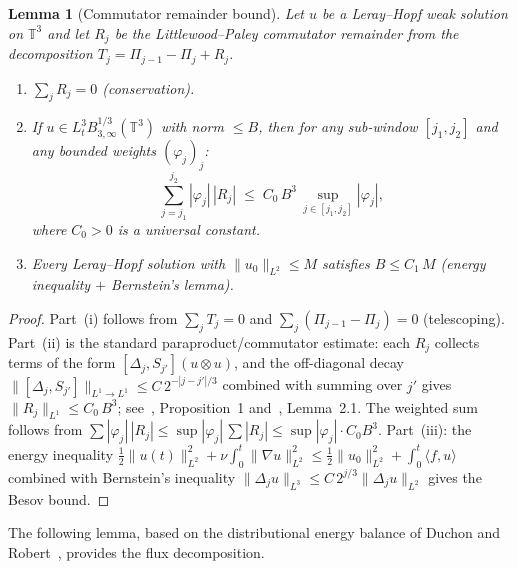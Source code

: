 \documentclass[12pt,a4paper]{article}
\theoremstyle{definition}
\theoremstyle{plain}
\newtheorem{lemma}[definition]{Lemma}
\theoremstyle{remark}
\begin{document}
\begin{lemma}[Commutator remainder bound]\label{lem:remainder}
Let $u$ be a Leray--Hopf weak solution on $\mathbb{T}^3$ and let $R_j$
be the Littlewood--Paley commutator remainder from the decomposition
$T_j = \Pi_{j-1} - \Pi_j + R_j$.
\begin{enumerate}
  \item[\textup{(i)}] $\sum_j R_j = 0$ (conservation).
  \item[\textup{(ii)}] If $u \in L^3_t B^{1/3}_{3,\infty}(\mathbb{T}^3)$
    with norm $\le B$, then for any sub-window $[j_1, j_2]$ and any
    bounded weights $(\varphi_j)_j$:
    \begin{equation}\label{eq:Rj-bound}
      \sum_{j=j_1}^{j_2} |\varphi_j|\,|R_j|
      \;\le\;
      C_0\,B^3\,\sup_{j \in [j_1,j_2]} |\varphi_j|,
    \end{equation}
    where $C_0 > 0$ is a universal constant.
  \item[\textup{(iii)}] Every Leray--Hopf solution with
    $\|u_0\|_{L^2} \le M$ satisfies $B \le C_1\,M$ (energy inequality
    $+$ Bernstein's lemma).
\end{enumerate}
\end{lemma}

\begin{proof}
Part~(i) follows from $\sum_j T_j = 0$ and $\sum_j(\Pi_{j-1}-\Pi_j)=0$
(telescoping). Part~(ii) is the standard paraproduct/commutator estimate:
each $R_j$ collects terms of the form $[\Delta_j, S_{j'}](u \otimes u)$,
and the off-diagonal decay $\|[\Delta_j, S_{j'}]\|_{L^1 \to L^1}
\le C\,2^{-|j-j'|/3}$ combined with summing over $j'$ gives $\|R_j\|_{L^1}
\le C_0\,B^3$; see~\cite{CET94}, Proposition~1 and~\cite{DR00},
Lemma~2.1. The weighted sum follows from
$\sum |{\varphi_j}|\,|{R_j}| \le \sup|\varphi_j|\,\sum|R_j|
\le \sup|\varphi_j|\cdot C_0 B^3$.
Part~(iii): the energy inequality $\frac{1}{2}\|u(t)\|_{L^2}^2
+ \nu\int_0^t \|\nabla u\|_{L^2}^2 \le \frac{1}{2}\|u_0\|_{L^2}^2
+ \int_0^t \langle f,u\rangle$ combined with Bernstein's inequality
$\|\Delta_j u\|_{L^3} \le C\,2^{j/3}\|\Delta_j u\|_{L^2}$ gives the
Besov bound.
\end{proof}

The following lemma, based on the distributional energy balance of
Duchon and Robert~\cite{DR00}, provides the flux decomposition.
\end{document}
